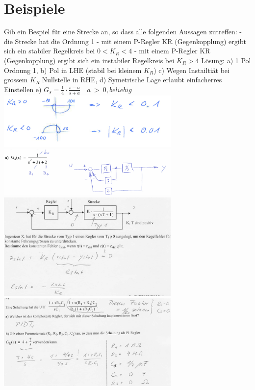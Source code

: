 \section{Beispiele}

\begin{multicols}{2}
Gib ein Bespiel für eine Strecke an, so dass alle folgenden Aussagen zutreffen:
- die Strecke hat die Ordnung 1
- mit einem P-Regler KR (Gegenkopplung) ergibt sich ein stabiler Regelkreis bei $0 < K_R < 4$
- mit einem P-Regler KR (Gegenkopplung) ergibt sich ein instabiler Regelkreis bei $K_R > 4$
Lösung: a) 1 Pol Ordnung 1, b) Pol in LHE (stabil bei kleinem $K_R$)  c) Wegen Instailtiät bei grossem $K_R$ Nullstelle in RHE, d) Symetrische Lage erlaubt einfacherres Einstellen e) $G_s=\frac{1}{4}\cdot\frac{s-a}{s+a} \quad a \ > \ 0, beliebig$ 
\includegraphics[width=9cm]{./images/beispiele/beispiel17.png}
\includegraphics[width=9cm]{./images/beispiele/beispiel1.png}
\includegraphics[width=9cm]{./images/beispiele/beispiel2.png}
\includegraphics[width=9cm]{./images/beispiele/beispiel3.png}

\end{multicols}
